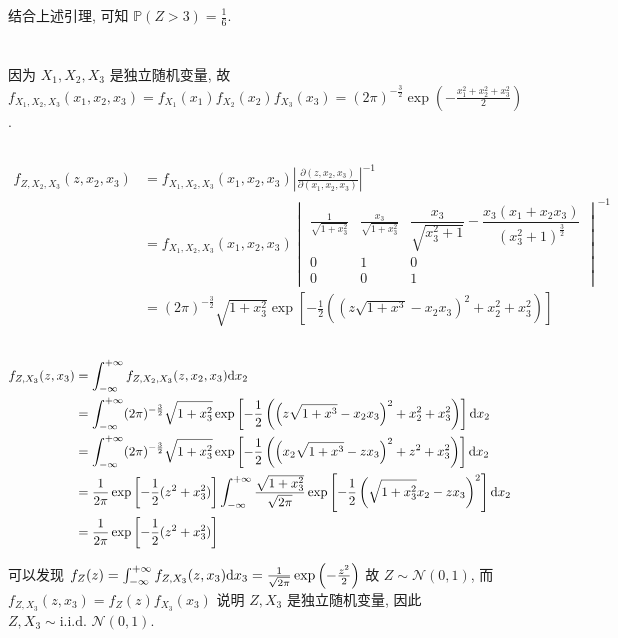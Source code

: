\documentclass[8pt]{article}
\theoremstyle{compact}
\def\P#1{\mathbb{P}\left({#1}\right)}
\begin{document}
结合上述引理, 可知 $\P{Z > 3} = \frac16$.

\section{}
\subsection{}
因为 $X_1, X_2, X_3$ 是独立随机变量, 故 $f_{X_1, X_2, X_3}(x_1, x_2, x_3) = f_{X_1}(x_1)f_{X_2}(x_2)f_{X_3}(x_3) = (2\pi)^{-\frac32}\exp\left(-\frac{x_1^2 + x_2^2 + x_3^2}{2}\right)$.
\subsection{}
\begin{equation}
	\begin{split}
		f_{Z, X_2, X_3}(z, x_2, x_3) &= f_{X_1, X_2, X_3}(x_1, x_2, x_3)\left|\frac{\partial(z, x_2, x_3)}{\partial(x_1, x_2, x_3)}\right|^{-1}\\
		&= f_{X_1, X_2, X_3}(x_1, x_2, x_3)\begin{vmatrix}
			\frac{1}{\sqrt{1 + x_3^2}} & \frac{x_3}{\sqrt{1 + x_3^2}} & \dfrac{x_3}{\sqrt{x_3^2+1}}-\dfrac{x_3\left(x_1+x_2x_3\right)}{\left(x_3^2+1\right)^\frac{3}{2}}\\
			0&1&0\\0&0&1
		\end{vmatrix}^{-1}\\
		&= (2\pi)^{-\frac32}\sqrt{1+x_3^2}\exp\left[-\frac12\left(\left(z\sqrt{1+x^3}-x_2x_3\right)^2+x_2^2+x_3^2\right)\right]
	\end{split}
\end{equation}
\subsection{}
\begin{equation}
	\begin{split}
		f_{Z, X_3}(z, x_3) &= \int_{-\infty}^{+\infty}f_{Z, X_2, X_3}(z, x_2, x_3)\text dx_2\\
		&= \int_{-\infty}^{+\infty} (2\pi)^{-\frac32}\sqrt{1+x_3^2}\exp\left[-\frac12\left(\left(z\sqrt{1+x^3}-x_2x_3\right)^2+x_2^2+x_3^2\right)\right]\text dx_2\\
		&= \int_{-\infty}^{+\infty} (2\pi)^{-\frac32}\sqrt{1+x_3^2}\exp\left[-\frac12\left(\left(x_2\sqrt{1+x^3}-zx_3\right)^2+z^2+x_3^2\right)\right]\text dx_2\\
		&= \frac{1}{2\pi}\exp\left[-\frac12(z^2 + x_3^2)\right]\int_{-\infty}^{+\infty}\frac{\sqrt{1 + x_3^2}}{\sqrt{2\pi}}\exp\left[-\frac12\left(\sqrt{1+x_3^2}x_2 - zx_3\right)^2\right]\text dx_2\\
		&= \frac{1}{2\pi}\exp\left[-\frac12(z^2 + x_3^2)\right]
	\end{split}
\end{equation}

可以发现 $f_Z(z) = \int_{-\infty}^{+\infty}f_{Z, X_3}(z, x_3)\text dx_3 = \frac{1}{\sqrt{2\pi}}\exp\left(-\frac{z^2}{2}\right)$ 故 $Z \sim \mathcal N(0, 1)$, 而 $f_{Z, X_3}(z, x_3) = f_Z(z)f_{X_3}(x_3)$ 说明 $Z, X_3$ 是独立随机变量, 因此 $Z, X_3 \sim \text{i.i.d. } \mathcal N(0, 1)$.
\end{document}
